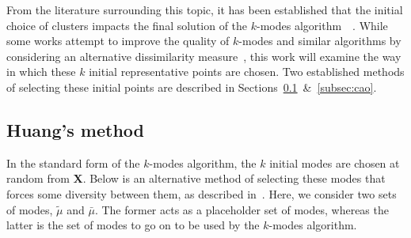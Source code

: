 From the literature surrounding this topic, it has been established that the 
initial choice of clusters impacts the final solution of the \(k\)-modes
algorithm~\cite{Huang98}~\cite{Cao09}. While some works attempt to improve the 
quality of \(k\)-modes and similar algorithms by considering an alternative 
dissimilarity measure~\cite{Ng07}, this work will examine the way in which these
\(k\) initial representative points are chosen. Two established methods of 
selecting these initial points are described in
Sections~\ref{subsec:huang}~\&~\ref{subsec:cao}.\\


\subsection{Huang's method}\label{subsec:huang}

In the standard form of the \(k\)-modes algorithm, the \(k\) initial modes are 
chosen at random from \textbf{X}. Below is an alternative method of selecting
these modes that forces some diversity between them, as described 
in~\cite{Huang98}. Here, we consider two sets of modes, \(\tilde{\mu}\) and
\(\bar{\mu}\). The former acts as a placeholder set of modes, whereas the latter
is the set of modes to go on to be used by the \(k\)-modes algorithm.\\

